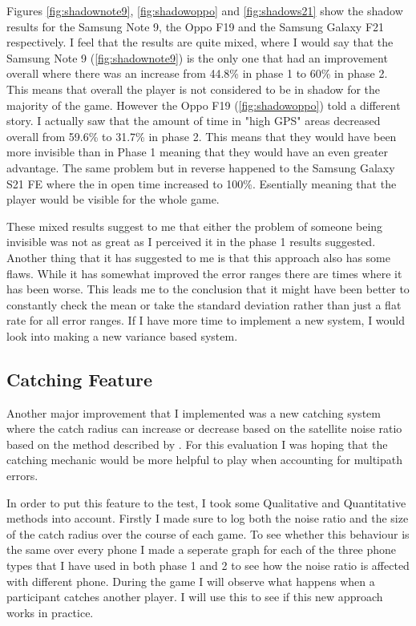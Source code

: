 \documentclass{l4proj}
\begin{document}
Figures \ref{fig:shadownote9}, \ref{fig:shadowoppo} and \ref{fig:shadows21} show the shadow results for the Samsung Note 9,
the Oppo F19 and the Samsung Galaxy F21 respectively. I feel that the results are quite mixed, where I would say that the
Samsung Note 9 (\ref{fig:shadownote9}) is the only one that had an improvement overall where there was an increase from
44.8\% in phase 1 to 60\% in phase 2. This means that overall the player is not considered to be in shadow for the majority
of the game. However the Oppo F19 (\ref{fig:shadowoppo}) told a different story. I actually saw that the amount
of time in "high GPS" areas decreased overall from 59.6\% to 31.7\% in phase 2. This means that they would have been more
invisible than in Phase 1 meaning that they would have an even greater advantage. The same problem but in reverse happened
to the Samsung Galaxy S21 FE where the in open time increased to 100\%. Esentially meaning that the player would be visible
for the whole game.

These mixed results suggest to me that either the problem of someone being invisible was not as great as I perceived it in
the phase 1 results suggested. Another thing that it has suggested to me is that this approach also has some flaws. While
it has somewhat improved the error ranges there are times where it has been worse. This leads me to the conclusion that it might
have been better to constantly check the mean or take the standard deviation rather than just a flat rate for all error ranges.
If I have more time to implement a new system, I would look into making a new variance based system.

\subsection{Catching Feature}
Another major improvement that I implemented was a new catching system where the catch radius can increase or decrease based
on the satellite noise ratio based on the method described by \cite{uberGPS}. For this evaluation I was hoping that the catching mechanic would be more helpful to play when
accounting for multipath errors.

In order to put this feature to the test, I took some Qualitative and Quantitative methods into account. Firstly I made sure to log both
the noise ratio and the size of the catch radius over the course of each game. To see whether this behaviour is the same over every phone
I made a seperate graph for each of the three phone types that I have used in both phase 1 and 2 to see how the noise ratio is affected
with different phone. During the game I will observe what happens when a participant catches another player. I will use this to see if
this new approach works in practice.
\end{document}

